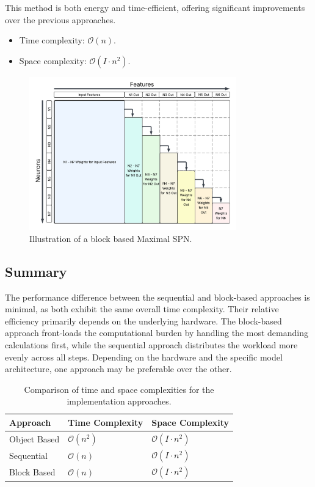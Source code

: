 This method is both energy and time-efficient, offering significant improvements over the previous approaches.

\begin{itemize}
    \item Time complexity: $\mathcal{O}(n)$.
    \item Space complexity: $\mathcal{O}(I \cdot n^2)$.
\end{itemize}

\begin{figure}[h!]
\centering
\includegraphics[width=0.8\textwidth]{Figures/Methodology/Block_Based_Maximal_SPN_Weights.png}
\caption{Illustration of a block based Maximal SPN.}
\label{fig:blockMaxSpn}
\end{figure}

\subsection{Summary}

The performance difference between the sequential and block-based approaches is minimal, as both exhibit the same overall time complexity. Their relative efficiency primarily depends on the underlying hardware. The block-based approach front-loads the computational burden by handling the most demanding calculations first, while the sequential approach distributes the workload more evenly across all steps. Depending on the hardware and the specific model architecture, one approach may be preferable over the other.

\begin{table}[h!]
\centering
\caption{Comparison of time and space complexities for the implementation approaches.}
\begin{tabular}{|l|l|l|}
\hline
\textbf{Approach}    & \textbf{Time Complexity} & \textbf{Space Complexity} \\
\hline
Object Based          & $\mathcal{O}(n^2)$        & $\mathcal{O}(I \cdot n^2)$        \\
Sequential          & $\mathcal{O}(n)$        & $\mathcal{O}(I \cdot n^2)$       \\
Block Based              & $\mathcal{O}(n)$        & $\mathcal{O}(I \cdot n^2)$        \\
\hline
\end{tabular}
\label{tab:approachescomplexityComparison}
\end{table}

